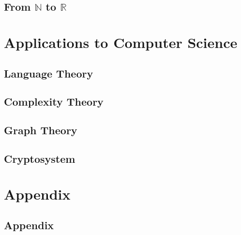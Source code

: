 \documentclass{report}
\theoremstyle{break}
\begin{document}
		\chapter{From $\mathbb{N}$ to $\mathbb{R}$}
			

	\part{Applications to Computer Science}
	
		\chapter{Language Theory}
			
		
		\chapter{Complexity Theory}
			
		
		\chapter{Graph Theory}
		    
		
		\chapter{Cryptosystem}
			
	
	\part{Appendix}
	
	    \chapter{Appendix}
	        
\end{document}
